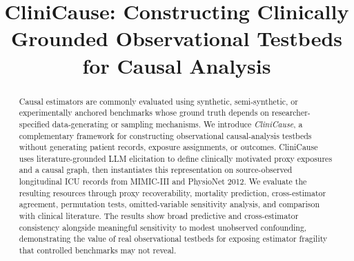 \documentclass[letterpaper]{article}
\title{CliniCause: Constructing Clinically Grounded Observational Testbeds for Causal Analysis}
\begin{document}
\maketitle


\begin{abstract}
Causal estimators are commonly evaluated using synthetic, semi-synthetic, or
experimentally anchored benchmarks whose ground truth depends on
researcher-specified data-generating or sampling mechanisms. We introduce
\emph{CliniCause}, a complementary framework for constructing observational
causal-analysis testbeds without generating patient records, exposure
assignments, or outcomes. CliniCause uses literature-grounded LLM elicitation
to define clinically motivated proxy exposures and a causal graph, then
instantiates this representation on source-observed longitudinal ICU records
from MIMIC-III and PhysioNet 2012. We evaluate the resulting resources through
proxy recoverability, mortality prediction, cross-estimator agreement,
permutation tests, omitted-variable sensitivity analysis, and comparison with
clinical literature. The results show broad predictive and cross-estimator
consistency alongside meaningful sensitivity to modest unobserved confounding,
demonstrating the value of real observational testbeds for exposing estimator
fragility that controlled benchmarks may not reveal.
\end{abstract}
\end{document}
